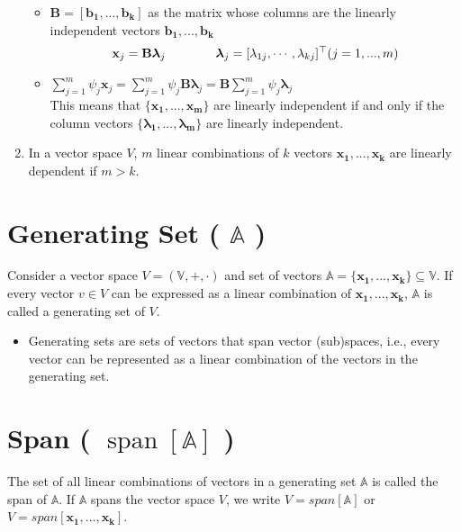 \begin{enumerate}
\begin{itemize}
        \item $\mathbf{B} = [\mathbf{b_1, ..., b_k}]$ as the matrix whose columns are the linearly independent vectors $\mathbf{b_1, ..., b_k}$
        \[
            \mathbf{x}_j = \mathbf{B{\bm{\lambda}}}_j \quad\quad\quad\quad \bm{\lambda}_j = [\lambda_{1j}, \cdots, \lambda_{kj}]^\top
            \hfill (j=1, ...,m)
        \]

        \item \( \displaystyle \sum_{j=1}^{m} \psi_j \mathbf{x}_j = \sum_{j=1}^{m} \psi_j \mathbf{B}\bm{\lambda}_j = \mathbf{B}\sum_{j=1}^{m} \psi_j \bm{\lambda}_j \)\\
        This means that $\{\mathbf{x_1, ..., x_m}\}$ are linearly independent if and only if the column vectors $\{\bm{\lambda_1, ..., \lambda_m}\}$ are linearly independent.

    \end{itemize}

    \item In a vector space $V$, $m$ linear combinations of $k$ vectors $\mathbf{x_1, ..., x_k}$ are linearly dependent if $m > k$.
\end{enumerate}


\section{Generating Set ( $\mathbb{A}$ ) \cite{mfml-1}}\label{Generating Set}
Consider a vector space $V = (\mathbb{V}, +, \cdot)$ and set of vectors $\mathbb{A} = \mathbf{\{x_1, . . . , x_k\}} \subseteq \mathbb{V}$. If every vector $v \in V$ can be expressed as a linear combination of $\mathbf{x_1, . . . , x_k}$, $\mathbb{A}$ is called a generating set of $V$.

\begin{itemize}
    \item Generating sets are sets of vectors that span vector (sub)spaces, i.e., every vector can be represented as a linear combination of the vectors in the generating set.
\end{itemize}


\section{Span ( $\operatorname{span}[\mathbb{A}]$ ) \cite{mfml-1}} \label{lin-alg: Span}
The set of all linear combinations of vectors in a generating set $\mathbb{A}$ is called the span of $\mathbb{A}$. If $\mathbb{A}$ spans the vector space $V$, we write $V = span[\mathbb{A}]$ or $V = span[\mathbf{x_1, . . . , x_k}]$.




